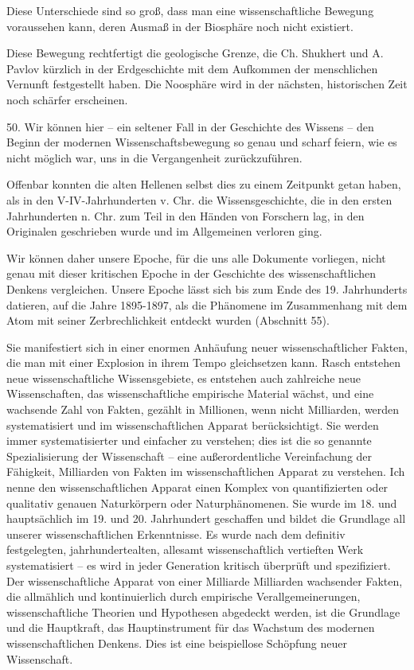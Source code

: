 \documentclass[11pt,a4paper]{book}
\begin{document}
Diese Unterschiede sind so groß, dass man eine wissenschaftliche Bewegung voraussehen kann, deren Ausmaß in der Biosphäre noch nicht existiert. 

Diese Bewegung rechtfertigt die geologische Grenze, die Ch. Shukhert und A. Pavlov kürzlich in der Erdgeschichte mit dem Aufkommen der menschlichen Vernunft festgestellt haben. Die Noosphäre wird in der nächsten, historischen Zeit noch schärfer erscheinen. 

50. Wir können hier -- ein seltener Fall in der Geschichte des Wissens -- den Beginn der modernen Wissenschaftsbewegung so genau und scharf feiern, wie es nicht möglich war, uns in die Vergangenheit zurückzuführen. 

Offenbar konnten die alten Hellenen selbst dies zu einem Zeitpunkt getan haben, als in den V-IV-Jahrhunderten v. Chr. die Wissensgeschichte, die in den ersten Jahrhunderten n. Chr. zum Teil in den Händen von Forschern lag, in den Originalen geschrieben wurde und im Allgemeinen verloren ging. 

Wir können daher unsere Epoche, für die uns alle Dokumente vorliegen, nicht genau mit dieser kritischen Epoche in der Geschichte des wissenschaftlichen Denkens vergleichen. Unsere Epoche lässt sich bis zum Ende des 19. Jahrhunderts datieren, auf die Jahre 1895-1897, als die Phänomene im Zusammenhang mit dem Atom mit seiner Zerbrechlichkeit entdeckt wurden (Abschnitt 55). 

Sie manifestiert sich in einer enormen Anhäufung neuer wissenschaftlicher Fakten, die man mit einer Explosion in ihrem Tempo gleichsetzen kann. Rasch entstehen neue wissenschaftliche Wissensgebiete, es entstehen auch zahlreiche neue Wissenschaften, das wissenschaftliche empirische Material wächst, und eine wachsende Zahl von Fakten, gezählt in Millionen, wenn nicht Milliarden, werden systematisiert und im wissenschaftlichen Apparat berücksichtigt. Sie werden immer systematisierter und einfacher zu verstehen; dies ist die so genannte Spezialisierung der Wissenschaft -- eine außerordentliche Vereinfachung der Fähigkeit, Milliarden von Fakten im wissenschaftlichen Apparat zu verstehen. Ich nenne den wissenschaftlichen Apparat einen Komplex von quantifizierten oder qualitativ genauen Naturkörpern oder Naturphänomenen. Sie wurde im 18. und hauptsächlich im 19. und 20. Jahrhundert geschaffen und bildet die Grundlage all unserer wissenschaftlichen Erkenntnisse. Es wurde nach dem definitiv festgelegten, jahrhundertealten, allesamt wissenschaftlich vertieften Werk systematisiert -- es wird in jeder Generation kritisch überprüft und spezifiziert. Der wissenschaftliche Apparat von einer Milliarde Milliarden wachsender Fakten, die allmählich und kontinuierlich durch empirische Verallgemeinerungen, wissenschaftliche Theorien und Hypothesen abgedeckt werden, ist die Grundlage und die Hauptkraft, das Hauptinstrument für das Wachstum des modernen wissenschaftlichen Denkens. Dies ist eine beispiellose Schöpfung neuer Wissenschaft. 
\end{document}
